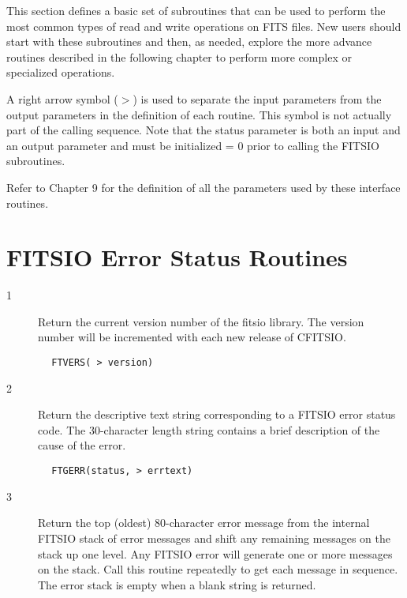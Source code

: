 \documentclass[11pt]{book}
\begin{document}
This section defines a basic set of subroutines that can be
used to perform the most common types of read and write operations
on FITS files.  New users should start with these subroutines and
then, as needed, explore the more advance routines described in
the following chapter to perform more complex or specialized operations.

A right arrow symbol ($>$) is used to separate the input parameters from
the output parameters in the  definition of each routine.  This symbol
is not actually part of the calling sequence.  Note that
the status parameter is both an input and an output parameter
and must be initialized = 0 prior to calling the FITSIO subroutines.

Refer to Chapter 9 for the definition of all the parameters
used by these interface routines.


\section{FITSIO Error Status Routines \label{FTVERS}}


\begin{description}
\item[1 ] Return the current version number of the fitsio library.
    The version number will be incremented with each new
   release of CFITSIO.
\end{description}

\begin{verbatim}
        FTVERS( > version)
\end{verbatim}

\begin{description}
\item[2 ] Return the descriptive text string corresponding to a FITSIO error
    status code.   The 30-character length string contains a brief
   description of the cause of the error.
\end{description}

\begin{verbatim}
        FTGERR(status, > errtext)
\end{verbatim}

\begin{description}
\item[3 ] Return the top (oldest) 80-character error message from the
    internal FITSIO stack of error messages and shift any remaining
    messages on the stack up one level.  Any FITSIO error will
    generate one or more messages on the stack.  Call this routine
    repeatedly to get each message in sequence.  The error stack is empty
   when a blank string is returned.
\end{description}
\end{document}
